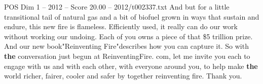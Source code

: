 \begin{textsample}{POS Dim 1 – 2012 – Score 20.00 – 2012/t002337.txt}
And but for a little transitional tail of natural gas and a bit of biofuel grown in ways that sustain and endure, this new fire is flameless.
Efficiently used, it really can do our work without working our undoing.
Each of you owns a piece of that \$5 trillion prize.
And our new book"Reinventing Fire"describes how you can capture it.
So with \textbf{the} conversation just begun at ReinventingFire. com, let me invite you each to engage with us and with each other, with everyone around you, to help make \textbf{the} world richer, fairer, cooler and safer by together reinventing fire.
Thank you.

\end{textsample}
